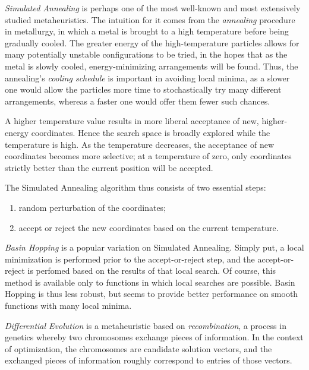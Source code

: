 \documentclass[12pt]{article}
\begin{document}
    \emph{Simulated Annealing}\cite{kirkpatrick1983} is perhaps one of the most
    well-known and most extensively studied metaheuristics.
    The intuition for it comes from the \emph{annealing} procedure in
    metallurgy, in which a metal is brought to a high temperature before being
    gradually cooled.
    The greater energy of the high-temperature particles allows for many
    potentially unstable configurations to be tried, in the hopes that as the
    metal is slowly cooled, energy-minimizing arrangements will be found.
    Thus, the annealing's \emph{cooling schedule} is important in avoiding
    local minima, as a slower one would allow the particles more time to
    stochastically try many different arrangements, whereas a faster one would
    offer them fewer such chances.

    A higher temperature value results in more liberal acceptance of new,
    higher-energy coordinates.
    Hence the search space is broadly explored while the temperature is high.
    As the temperature decreases, the acceptance of new coordinates becomes
    more selective; at a temperature of zero, only coordinates strictly better
    than the current position will be accepted.

    The Simulated Annealing algorithm thus consists of two essential steps:
    \begin{enumerate}
        \item random perturbation of the coordinates;
        \item accept or reject the new coordinates based on the current
            temperature.
    \end{enumerate}

    \emph{Basin Hopping}\cite{wales1997} is a popular variation on Simulated
    Annealing.
    Simply put, a local minimization is performed prior to the accept-or-reject
    step, and the accept-or-reject is perfomed based on the results of that
    local search.
    Of course, this method is available only to functions in which local
    searches are possible.
    Basin Hopping is thus less robust, but seems to provide better performance
    on smooth functions with many local minima.

    \emph{Differential Evolution}\cite{storn1997} is a metaheuristic based on
    \emph{recombination}, a process in genetics whereby two chromosomes
    exchange pieces of information.
    In the context of optimization, the chromosomes are candidate solution
    vectors, and the exchanged pieces of information roughly correspond to
    entries of those vectors.
\end{document}
